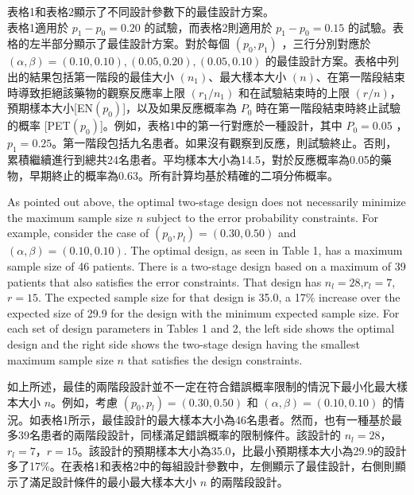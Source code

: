 	表格1和表格2顯示了不同設計參數下的最佳設計方案。\\表格1適用於 $p_1 - p_0 = 0.20$ 的試驗，而表格2則適用於 $p_1 - p_0 = 0.15$ 的試驗。表格的左半部分顯示了最佳設計方案。對於每個 $(p_0, p_1)$ ，三行分別對應於 $(\alpha,\beta) = (0.10,0.10),(0.05,0.20),(0.05,0.10)$ 的最佳設計方案。表格中列出的結果包括第一階段的最佳大小 $(n_1)$、最大樣本大小 $(n)$、在第一階段結束時導致拒絕該藥物的觀察反應率上限 $(r_1/n_1)$ 和在試驗結束時的上限 $(r/n)$，預期樣本大小[EN$(p_0)$]，以及如果反應概率為 $P_0$ 時在第一階段結束時終止試驗的概率 [PET$(p_0)$]。例如，表格1中的第一行對應於一種設計，其中 $P_0 = 0.05$ ，$p_1 = 0.25$。第一階段包括九名患者。如果沒有觀察到反應，則試驗終止。否則，累積繼續進行到總共24名患者。平均樣本大小為14.5，對於反應概率為0.05的藥物，早期終止的概率為0.63。所有計算均基於精確的二項分佈概率。

	As pointed out above, the optimal two-stage design does not necessarily minimize the maximum sample size $n$ subject to the error probability constraints. For example, consider the case of $(p_0,p_l) = (0.30,0.50)$ and $(\alpha,\beta) = (0.10,0.10)$. The optimal design, as seen in Table 1, has a maximum sample size of 46 patients. There is a two-stage design based on a maximum of 39 patients that also satisfies the error constraints. That design has $n_l = 28$,$r_l = 7$,$r = 15$. The expected sample size for that design is 35.0, a 17\% increase over the expected size of 29.9 for the design with the minimum expected sample size. For each set of design parameters in Tables 1 and 2, the left side shows the optimal design and the right side shows the two-stage design having the smallest maximum sample size $n$ that satisfies the design constraints. 

	如上所述，最佳的兩階段設計並不一定在符合錯誤概率限制的情況下最小化最大樣本大小 $n$。例如，考慮 $(p_0,p_l) = (0.30,0.50)$ 和 $(\alpha,\beta) = (0.10,0.10)$ 的情況。如表格1所示，最佳設計的最大樣本大小為46名患者。然而，也有一種基於最多39名患者的兩階段設計，同樣滿足錯誤概率的限制條件。該設計的 $n_l = 28$，$r_l = 7$，$r = 15$。該設計的預期樣本大小為35.0，比最小預期樣本大小為29.9的設計多了17\%。在表格1和表格2中的每組設計參數中，左側顯示了最佳設計，右側則顯示了滿足設計條件的最小最大樣本大小 $n$ 的兩階段設計。


